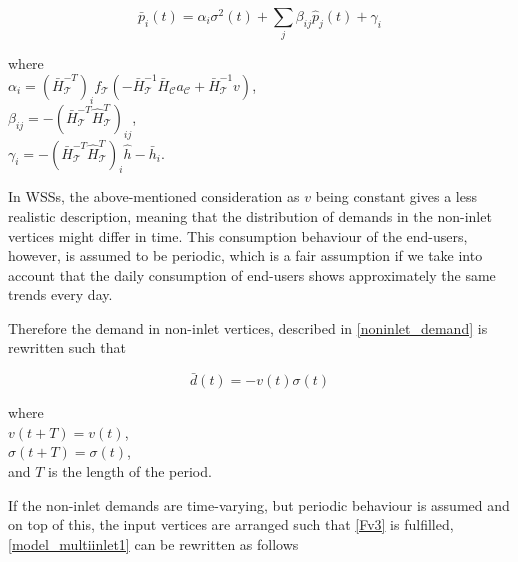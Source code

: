 \begin{equation}
\label{model_multiinlet1}
\bar{p}_i(t) = \alpha_i \sigma^2(t) + \sum_j \beta_{ij} \hat{p}_j(t) + \gamma_i
\end{equation}

  \begin{minipage}[t]{0.45\textwidth}
where\\
\hspace*{8mm} $ \alpha_i = (\bar{H}^{-T}_{\mathcal{T}})_i f_{\mathcal{T}}(-\bar{H}^{-1}_{\mathcal{T}} \bar{H}_{\mathcal{C}} a_{\mathcal{C}} + \bar{H}^{-1}_{\mathcal{T}} v)$, \\
\vspace*{7pt}
\hspace*{8mm} $ \beta_{ij} = -(\bar{H}^{-T}_{\mathcal{T}}\hat{H}^{T}_{\mathcal{T}})_{ij} $, \\
\vspace*{7pt}
\hspace*{8mm} $ \gamma_{i} = -(\bar{H}^{-T}_{\mathcal{T}}\hat{H}^{T}_{\mathcal{T}})_{i}\hat{h} - \bar{h}_i $. 

\end{minipage}

In WSSs, the above-mentioned consideration as $v$ being constant gives a less realistic description, meaning that the distribution of demands in the non-inlet vertices might differ in time. This consumption behaviour of the end-users, however, is assumed to be periodic, which is a fair assumption if we take into account that the daily consumption of end-users shows approximately the same trends every day. 

Therefore the demand in non-inlet vertices, described in \eqref{noninlet_demand} is rewritten such that

\begin{equation}
\label{noninlet_demand_time_varying}
\bar{d}(t) = - v(t) \sigma(t)
\end{equation}

\begin{minipage}[t]{0.45\textwidth}
where\\
\hspace*{8mm} $v(t+T) = v(t)$,\\
\hspace*{8mm} $\sigma(t+T) = \sigma(t)$,\\
and \hspace*{1mm} $T$ is the length of the period.
\end{minipage}

If the non-inlet demands are time-varying, but periodic behaviour is assumed and on top of this, the input vertices are arranged such that \eqref{Fv3} is fulfilled, \eqref{model_multiinlet1} can be rewritten as follows


